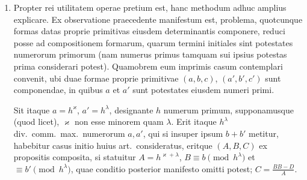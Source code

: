 \documentclass[12pt,a4paper]{article}
\theoremstyle{plain}
\theoremstyle{definition}
\theoremstyle{remark}
\theoremstyle{problemstyle}
\begin{document}
\begin{enumerate}[label=\arabic*)]
Nullo negotio probatur, eandem propositionem adhucdum valere, etiamsi forma $(A, B, C)$ sit improprie primitiva vel derivata. Hoc itaque modo quaelibet forma in alias eiusdem determinantis resolvi potest, quarum termini antecedentes omnes sint vel numeri primi vel numerorum primorum potestates. Talis resolutio saepenumero commode applicari potest, si ex pluribus formis datis componenda est una. Ita e.g.\ si quaeritur forma composita e formis $(3, 1, 134)$, $(10, 3, 41)$, $(15, 2, 27)$, resolvatur secunda in has $(2, 1, 201)$, $(5, -2, 81)$, tertia in has $(3, -1, 134)$, $(5, 2, 81)$, patetque, formam ex quinque formis $(3, 1, 134)$, $(2, 1, 201)$, $(5, -2, 81)$, $(3, -1, 134)$, $(5, 2, 81)$ compositam, quocunque ordine accipiantur, etiam ex tribus datis compositam fore. At ex compositione primae cum quarta oritur forma principalis $(1, 0, 401)$; eadem provenit ex compositione tertiae cum quinta; quare ex compositione cunctarum conflatur forma $(2, 1, 201)$.

\item Propter rei utilitatem operae pretium est, hanc methodum adhuc amplius explicare. Ex observatione praecedente manifestum est, problema, quotcunque formas datas proprie primitivas eiusdem determinantis componere, reduci posse ad compositionem formarum, quarum termini initiales sint potestates numerorum primorum (nam numerus primus tamquam sui ipsius potestas prima considerari potest). Quamobrem eum imprimis casum contemplari convenit, ubi duae formae proprie primitivae $(a, b, c)$, $(a', b', c')$ sunt componendae, in quibus $a$ et $a'$ sunt potestates eiusdem numeri primi.

Sit itaque $a = h^\varkappa$, $a' = h^\lambda$, designante $h$ numerum primum, supponamusque (quod licet), $\varkappa$ non esse minorem quam $\lambda$. Erit itaque $h^\lambda$ div.\ comm.\ max.\ numerorum $a, a'$, qui si insuper ipsum $b + b'$ metitur, habebitur casus initio huius art.\ consideratus, eritque $(A, B, C)$ ex propositis composita, si statuitur $A = h^{\varkappa + \lambda}$, $B \equiv b \pmod{h^\lambda}$ et $\equiv b' \pmod{h^\lambda}$, quae conditio posterior manifesto omitti potest; $C = \frac{BB - D}{A}$.


\end{enumerate}
\end{document}
